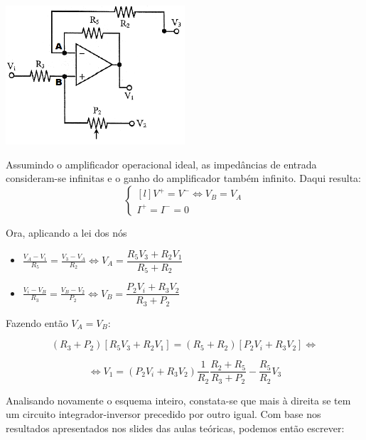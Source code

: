 \documentclass[a4paper,11pt]{report}
\begin{document}
\begin{center}
     \includegraphics[angle=0,width=0.5\textwidth]{cdif.png}
     \label{fig:cdif}
     \end{center}


Assumindo o amplificador operacional ideal, as impedâncias de entrada consideram-se infinitas e o ganho do amplificador também infinito. Daqui resulta:
\begin{equation} \label{eq:ampopideal}
\left\{ \begin{matrix*}[l]
	V^+=V^-\Leftrightarrow V_B=V_A\\
	I^+=I^-=0
	\end{matrix*} \right.
\end{equation}

Ora, aplicando a lei dos nós
\begin{itemize}
\item 
$\frac{V_A-V_1}{R_5}=\frac{V_3-V_A}{R_2}\Leftrightarrow V_A=\dfrac{R_5V_3+R_2V_1}{R_5+R_2}$
\item
$\frac{V_i-V_B}{R_3}=\frac{V_B-V_2}{P_2}\Leftrightarrow V_B=\dfrac{P_2V_i+R_3V_2}{R_3+P_2}$
\end{itemize}

Fazendo então $V_A=V_B$:

\begin{equation*}
(R_3+P_2)[R_5V_3+R_2V_1]=(R_5+R_2)[P_2V_i+R_3V_2]\Leftrightarrow
\end{equation*}

\begin{equation}\label{eq:v1}
\Leftrightarrow V_1=(P_2V_i+R_3V_2)\frac{1}{R_2}\dfrac{R_2+R_5}{R_3+P_2}-\frac{R_5}{R_2}V_3
\end{equation}
	
	

Analisando novamente o esquema inteiro, constata-se que mais à direita se tem um circuito integrador-inversor precedido por outro igual. Com base nos resultados apresentados nos slides das aulas teóricas, podemos então escrever:
\end{document}
